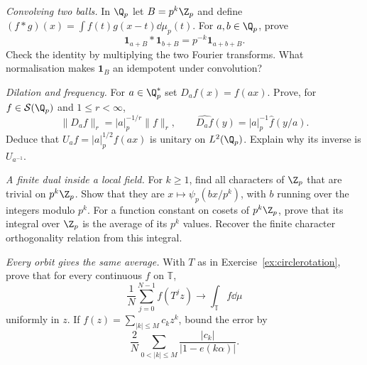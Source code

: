 \begin{exercise}[$\star$]\label{ex:v8c13a}
\emph{Convolving two balls.} In $\Q_p$ let $B=p^k\Z_p$ and define $(f*g)(x)=\int f(t)g(x-t)\dd\mu_p(t)$. For $a,b\in\Q_p$, prove
\[\mathbf1_{a+B}*\mathbf1_{b+B}=p^{-k}\mathbf1_{a+b+B}.\]
Check the identity by multiplying the two Fourier transforms. What normalisation makes $\mathbf1_B$ an idempotent under convolution?
\end{exercise}
\begin{exercise}[$\star\star$]\label{ex:v8c13b}
\emph{Dilation and frequency.} For $a\in\Q_p^*$ set $D_af(x)=f(ax)$. Prove, for $f\in\mathcal S(\Q_p)$ and $1\le r<\infty$,
\[\|D_af\|_r=|a|_p^{-1/r}\|f\|_r,\qquad
\widehat{D_af}(y)=|a|_p^{-1}\hat f(y/a).\]
Deduce that $U_af=|a|_p^{1/2}f(ax)$ is unitary on $L^2(\Q_p)$. Explain why its inverse is $U_{a^{-1}}$.
\end{exercise}
\begin{exercise}[$\star\star$]\label{ex:v8c13c}
\emph{A finite dual inside a local field.} For $k\ge1$, find all characters of $\Z_p$ that are trivial on $p^k\Z_p$. Show that they are $x\mapsto\psi_p(bx/p^k)$, with $b$ running over the integers modulo $p^k$. For a function constant on cosets of $p^k\Z_p$, prove that its integral over $\Z_p$ is the average of its $p^k$ values. Recover the finite character orthogonality relation from this integral.
\end{exercise}
\begin{exercise}[$\star\star$]\label{ex:v8c13d}
\emph{Every orbit gives the same average.} With $T$ as in Exercise~\ref{ex:circlerotation}, prove that for every continuous $f$ on $\mathbb T$,
\[\frac1N\sum_{j=0}^{N-1}f(T^jz)\longrightarrow\int_{\mathbb T}f\dd\mu\]
uniformly in $z$. If $f(z)=\sum_{|k|\le M}c_kz^k$, bound the error by
\[\frac2N\sum_{0<|k|\le M}\frac{|c_k|}{|1-e(k\alpha)|}.\]
\end{exercise}

